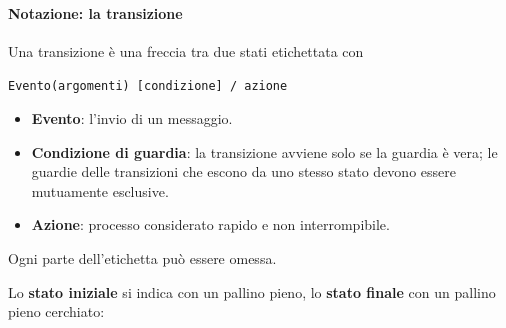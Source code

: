 \documentclass[a4paper,12pt]{article}
\begin{document}
\paragraph{Notazione: la transizione}
Una transizione è una freccia tra due stati etichettata con
\begin{center}
\texttt{Evento(argomenti) [condizione] / azione}
\end{center}
\begin{itemize}
  \item \textbf{Evento}: l'invio di un messaggio.
  \item \textbf{Condizione di guardia}: la transizione avviene solo se la guardia è
        vera; le guardie delle transizioni che escono da uno stesso stato devono essere
        mutuamente esclusive.
  \item \textbf{Azione}: processo considerato rapido e non interrompibile.
\end{itemize}
Ogni parte dell'etichetta può essere omessa.

Lo \textbf{stato iniziale} si indica con un pallino pieno, lo \textbf{stato finale} con
un pallino pieno cerchiato:
\begin{center}
\end{center}
\end{document}
